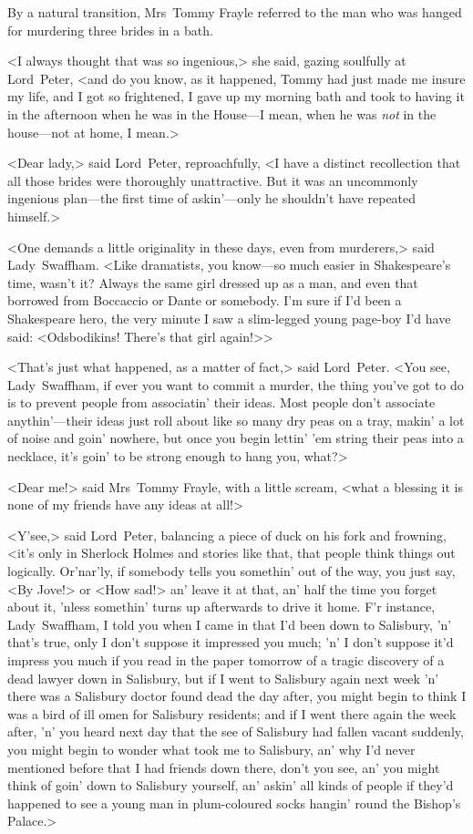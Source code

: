 By a natural transition, Mrs~Tommy Frayle referred to the man who was hanged for murdering three brides in a bath.

<I always thought that was so ingenious,> she said, gazing soulfully at Lord~Peter, <and do you know, as it happened, Tommy had just made me insure my life, and I got so frightened, I gave up my morning bath and took to having it in the afternoon when he was in the House—I mean, when he was \emph{not} in the house—not at home, I mean.>

<Dear lady,> said Lord~Peter, reproachfully, <I have a distinct recollection that all those brides were thoroughly unattractive. But it was an uncommonly ingenious plan—the first time of askin'—only he shouldn't have repeated himself.>

<One demands a little originality in these days, even from murderers,> said Lady~Swaffham. <Like dramatists, you know—so much easier in Shakespeare's time, wasn't it? Always the same girl dressed up as a man, and even that borrowed from Boccaccio or Dante or somebody. I'm sure if I'd been a Shakespeare hero, the very minute I saw a slim-legged young page-boy I'd have said: <Odsbodikins! There's that girl again!>>

<That's just what happened, as a matter of fact,> said Lord~Peter. <You see, Lady~Swaffham, if ever you want to commit a murder, the thing you've got to do is to prevent people from associatin' their ideas. Most people don't associate anythin'—their ideas just roll about like so many dry peas on a tray, makin' a lot of noise and goin' nowhere, but once you begin lettin' 'em string their peas into a necklace, it's goin' to be strong enough to hang you, what?>

<Dear me!> said Mrs~Tommy Frayle, with a little scream, <what a blessing it is none of my friends have any ideas at all!>

<Y'see,> said Lord~Peter, balancing a piece of duck on his fork and frowning, <it's only in Sherlock Holmes and stories like that, that people think things out logically. Or'nar'ly, if somebody tells you somethin' out of the way, you just say, <By Jove!> or <How sad!> an' leave it at that, an' half the time you forget about it, 'nless somethin' turns up afterwards to drive it home. F'r instance, Lady~Swaffham, I told you when I came in that I'd been down to Salisbury, 'n' that's true, only I don't suppose it impressed you much; 'n' I don't suppose it'd impress you much if you read in the paper tomorrow of a tragic discovery of a dead lawyer down in Salisbury, but if I went to Salisbury again next week 'n' there was a Salisbury doctor found dead the day after, you might begin to think I was a bird of ill omen for Salisbury residents; and if I went there again the week after, 'n' you heard next day that the see of Salisbury had fallen vacant suddenly, you might begin to wonder what took me to Salisbury, an' why I'd never mentioned before that I had friends down there, don't you see, an' you might think of goin' down to Salisbury yourself, an' askin' all kinds of people if they'd happened to see a young man in plum-coloured socks hangin' round the Bishop's Palace.>

